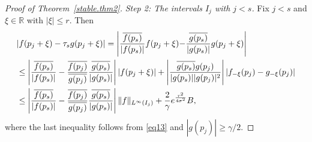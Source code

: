 \documentclass[10pt,a4paper]{amsart}
\newcommand{\R}{\mathbb{R}}
\begin{document}
\begin{proof}[Proof of Theorem~\ref{stable.thm2}]
\medskip
\noindent
\emph{Step 2: The intervals \(I_j\) with \(j<s\).}
Fix $j<s$ and $\xi\in\R$ with $|\xi|\le r$. Then
 \begin{align}\label{stable.thm.eq.left1}
  &    |f(p_j + \xi) - \tau_s g(p_j + \xi)|%
       =   \left|\frac{\overline{f(p_s)}}{|f(p_s)|} f(p_j + \xi) \hskip-.03in - \hskip-.03in \frac{\overline{g(p_s)}}{|g(p_s)|} g(p_j + \xi)\right| \hskip-.05in \notag\\
     &    \le  \left| \frac{\overline{f(p_s)} }{|f(p_s)|} -   \frac{\overline{f(p_j)}}{\overline{g(p_j)}} \frac{\overline{g(p_s)}}{|g(p_s)|} \right|  |f(p_j  + \xi)|   %
     + \left| \frac{\overline{g(p_s)} g(p_j)}{|g(p_s)| |g(p_j)|^2} \right| |f_ {-\xi}(p_j) - g_{-\xi}(p_j )| 
      \notag  \\
 &     \le  \left| \frac{\overline{f(p_s)}}{|f(p_s)|} - \frac{\overline{f(p_j)}}{\overline{g(p_j)}} \frac{\overline{g(p_s)}}{|g(p_s)|} \right| \|f\|_{L^{\infty}(I_j)} +\frac{2}{\gamma} e^{\frac{r^2}{4\sigma^2}}B, 
    \end{align}
where the last inequality follows from \eqref{eq13} and 
$|g(p_j)|\ge \gamma/2$.



\end{proof}
\end{document}
